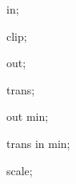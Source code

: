 %
%

{
  

  \attribute in;

  \attribute clip;
  
  \attribute out;
  
  \attribute trans;

  \attribute out min;

  \attribute trans in min;

  \attribute scale;

}
